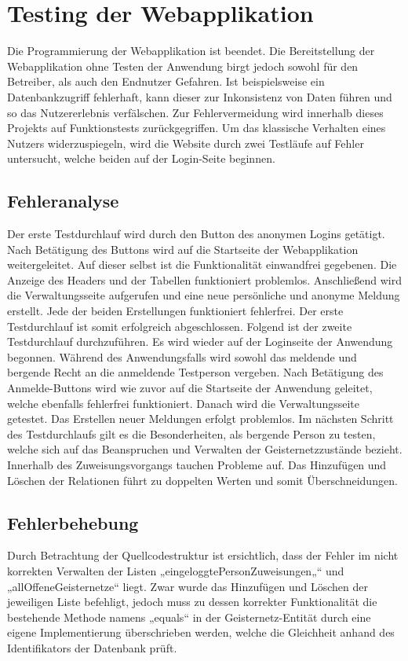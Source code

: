 \documentclass[11pt]{article}
\begin{document}
    \newpage
    \section{Testing der Webapplikation}
    Die Programmierung der Webapplikation ist beendet. Die Bereitstellung der Webapplikation ohne Testen der Anwendung birgt jedoch sowohl für den Betreiber, als auch den Endnutzer Gefahren.
    Ist beispielsweise ein Datenbankzugriff fehlerhaft, kann dieser zur Inkonsistenz von Daten führen und so das Nutzererlebnis verfälschen. Zur Fehlervermeidung wird innerhalb dieses Projekts auf Funktionstests zurückgegriffen.
    Um das klassische Verhalten eines Nutzers widerzuspiegeln, wird die Website durch zwei Testläufe auf Fehler untersucht, welche beiden auf der Login-Seite beginnen.
    
    \subsection{Fehleranalyse} 
    Der erste Testdurchlauf wird durch den Button des anonymen Logins getätigt. Nach Betätigung des Buttons wird auf die Startseite der Webapplikation weitergeleitet. Auf dieser selbst ist die Funktionalität
    einwandfrei gegebenen. Die Anzeige des Headers und der Tabellen funktioniert problemlos. Anschließend wird die Verwaltungsseite aufgerufen und eine neue persönliche und anonyme Meldung erstellt. Jede der beiden Erstellungen funktioniert fehlerfrei.
    Der erste Testdurchlauf ist somit erfolgreich abgeschlossen. Folgend ist der zweite Testdurchlauf durchzuführen. Es wird wieder auf der Loginseite der Anwendung begonnen. Während des Anwendungsfalls wird sowohl das meldende und bergende Recht an die anmeldende Testperson vergeben.
    Nach Betätigung des Anmelde-Buttons wird wie zuvor auf die Startseite der Anwendung geleitet, welche ebenfalls fehlerfrei funktioniert. Danach wird die Verwaltungsseite getestet. Das Erstellen neuer Meldungen erfolgt problemlos. Im nächsten Schritt des Testdurchlaufs gilt es die Besonderheiten, als bergende Person
    zu testen, welche sich auf das Beanspruchen und Verwalten der Geisternetzzustände bezieht. Innerhalb des Zuweisungsvorgangs tauchen Probleme auf. Das Hinzufügen und Löschen der Relationen führt zu doppelten Werten und somit Überschneidungen. 
    
    \subsection{Fehlerbehebung}
    Durch Betrachtung der Quellcodestruktur ist ersichtlich, dass der Fehler im nicht korrekten Verwalten der Listen „eingeloggtePersonZuweisungen„“ und „allOffeneGeisternetze“ liegt. Zwar wurde das Hinzufügen und Löschen der jeweiligen Liste befehligt, jedoch muss zu dessen korrekter
    Funktionalität die bestehende Methode namens „equals“ in der Geisternetz-Entität durch eine eigene Implementierung überschrieben werden, welche die Gleichheit anhand des Identifikators der Datenbank prüft. 
\end{document}
